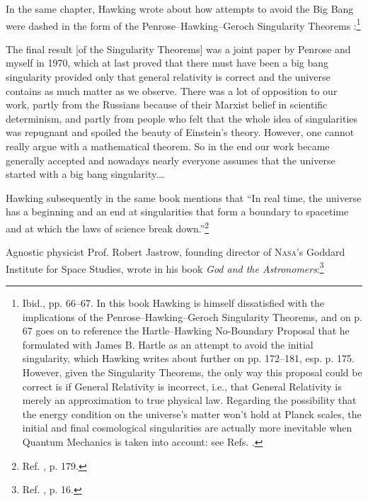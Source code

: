 \documentclass[letterpaper,12pt]{article}
\newenvironment{squote}
  {\small\quote}
  {\endquote\normalsize}
\begin{document}
In the same chapter, Hawking wrote about how attempts to avoid the Big Bang were dashed in the form of the Penrose--Hawking--Geroch Singularity Theorems \cite{Geroch1966,Geroch1967,Geroch1970,Hawking1965,Hawking1966a,Hawking1966b,Hawking1967,HawkingEllis1968,HawkingPenrose1970,Penrose1965,Penrose1968,Penrose1969}:\footnote{Ibid., pp. 66--67. In this book Hawking is himself dissatisfied with the implications of the Penrose--Hawking--Geroch Singularity Theorems, and on p. 67 goes on to reference the Hartle--Hawking No-Boundary Proposal \cite{Hawking1982,HartleHawking1983} that he formulated with James B. Hartle as an attempt to avoid the initial singularity, which Hawking writes about further on pp. 172--181, esp. p. 175. However, given the Singularity Theorems, the only way this proposal could be correct is if General Relativity is incorrect, i.e., that General Relativity is merely an approximation to true physical law. Regarding the possibility that the energy condition on the universe's matter won't hold at Planck scales, the initial and final cosmological singularities are actually more inevitable when Quantum Mechanics is taken into account: see Refs. .}

\begin{squote}
The final result [of the Singularity Theorems] was a joint paper by Penrose and myself in 1970, which at last proved that there must have been a big bang singularity provided only that general relativity is correct and the universe contains as much matter as we observe. There was a lot of opposition to our work, partly from the Russians because of their Marxist belief in scientific determinism, and partly from people who felt that the whole idea of singularities was repugnant and spoiled the beauty of Einstein's theory. However, one cannot really argue with a mathematical theorem. So in the end our work became generally accepted and nowadays nearly everyone assumes that the universe started with a big bang singularity.\thinspace\ldots
\end{squote}

Hawking subsequently in the same book mentions that ``In real time, the universe has a beginning and an end at singularities that form a boundary to spacetime and at which the laws of science break down.''\footnote{Ref. , p. 179.}

Agnostic physicist Prof. Robert Jastrow, founding director of \textsc{Nasa}'s Goddard Institute for Space Studies, wrote in his book \emph{God and the Astronomers}:\footnote{Ref. , p. 16.}
\end{document}
